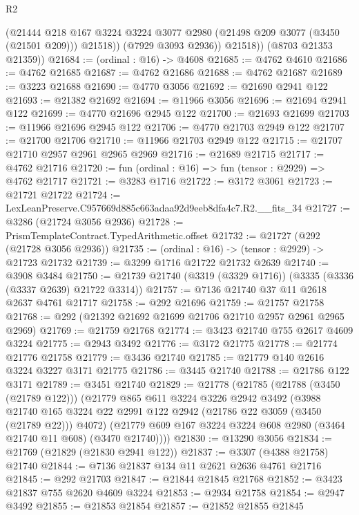 \begin{lexlean}{R2}
\begin{coremodule}
              (@21444
                @218
                @167
                @3224
                @3224
                @3077
                @2980
                (@21498 @209 @3077 (@3450 (@21501 @209)))
                @21518))
            (@7929 @3093 @2936))
          @21518))
      (@8703 @21353 @21359))
@21684 := (ordinal : @16) -> @4608
@21685 := @4762 @4610
@21686 := @4762 @21685
@21687 := @4762 @21686
@21688 := @4762 @21687
@21689 := @3223 @21688
@21690 := @4770 @3056
@21692 := @21690 @2941 @122
@21693 := @21382 @21692
@21694 := @11966 @3056
@21696 := @21694 @2941 @122
@21699 := @4770 @21696 @2945 @122
@21700 := @21693 @21699
@21703 := @11966 @21696 @2945 @122
@21706 := @4770 @21703 @2949 @122
@21707 := @21700 @21706
@21710 := @11966 @21703 @2949 @122
@21715 := @21707 @21710 @2957 @2961 @2965 @2969
@21716 := @21689 @21715
@21717 := @4762 @21716
@21720 := fun (ordinal : @16) => fun (tensor : @2929) => @4762 @21717
@21721 := @3283 @1716
@21722 := @3172 @3061
@21723 := @21721 @21722
@21724 := LexLeanPreserve.C957669d885c663adaa92d9eeb8dfa4c7.R2.__fits_34
@21727 := @3286 (@21724 @3056 @2936)
@21728 := PrismTemplateContract.TypedArithmetic.offset
@21732 := @21727 (@292 (@21728 @3056 @2936))
@21735 := (ordinal : @16) -> (tensor : @2929) -> @21723 @21732
@21739 := @3299 @1716 @21722 @21732 @2639
@21740 := @3908 @3484
@21750 := @21739 @21740 (@3319 (@3329 @1716)) (@3335 (@3336 (@3337 @2639) @21722 @3314))
@21757 := @7136 @21740 @37 @11 @2618 @2637 @4761 @21717
@21758 := @292 @21696
@21759 := @21757 @21758
@21768 := @292 (@21392 @21692 @21699 @21706 @21710 @2957 @2961 @2965 @2969)
@21769 := @21759 @21768
@21774 := @3423 @21740 @755 @2617 @4609 @3224
@21775 := @2943 @3492
@21776 := @3172 @21775
@21778 := @21774 @21776 @21758
@21779 := @3436 @21740
@21785 := @21779 @140 @2616 @3224 @3227 @3171 @21775
@21786 := @3445 @21740
@21788 := @21786 @122 @3171
@21789 := @3451 @21740
@21829 := @21778
    (@21785
      (@21788 (@3450 (@21789 @122)))
      (@21779
        @865
        @611
        @3224
        @3226
        @2942
        @3492
        (@3988 @21740 @165 @3224 @22 @2991 @122 @2942 (@21786 @22 @3059 (@3450 (@21789 @22))) @4072)
        (@21779 @609 @167 @3224 @3224 @608 @2980 (@3464 @21740 @11 @608) (@3470 @21740))))
@21830 := @13290 @3056
@21834 := @21769 (@21829 (@21830 @2941 @122))
@21837 := @3307 (@4388 @21758) @21740
@21844 := @7136 @21837 @134 @11 @2621 @2636 @4761 @21716
@21845 := @292 @21703
@21847 := @21844 @21845 @21768
@21852 := @3423 @21837 @755 @2620 @4609 @3224
@21853 := @2934 @21758
@21854 := @2947 @3492
@21855 := @21853 @21854
@21857 := @21852 @21855 @21845

\end{coremodule}
\end{lexlean}
